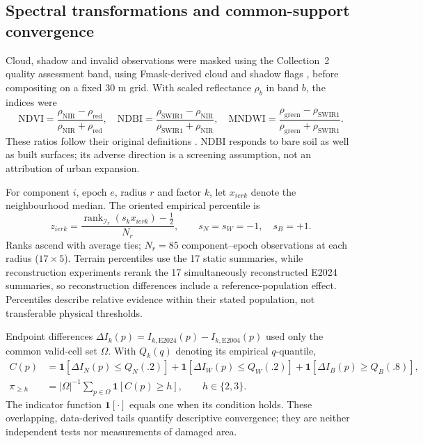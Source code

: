 \subsection{Spectral transformations and common-support convergence}
Cloud, shadow and invalid observations were masked using the Collection~2 quality assessment band, using Fmask-derived cloud and shadow flags \citep{zhu2012fmask,zhu2015fmask}, before compositing on a fixed 30 m grid. With scaled reflectance $\rho_b$ in band $b$, the indices were
\begin{equation}\label{eq:indices}
\mathrm{NDVI}=\frac{\rho_{\mathrm{NIR}}-\rho_{\mathrm{red}}}{\rho_{\mathrm{NIR}}+\rho_{\mathrm{red}}},\quad
\mathrm{NDBI}=\frac{\rho_{\mathrm{SWIR1}}-\rho_{\mathrm{NIR}}}{\rho_{\mathrm{SWIR1}}+\rho_{\mathrm{NIR}}},\quad
\mathrm{MNDWI}=\frac{\rho_{\mathrm{green}}-\rho_{\mathrm{SWIR1}}}{\rho_{\mathrm{green}}+\rho_{\mathrm{SWIR1}}}.
\end{equation}
These ratios follow their original definitions \citep{tucker1979ndvi,zha2003ndbi,xu2006mndwi}. NDBI responds to bare soil as well as built surfaces; its adverse direction is a screening assumption, not an attribution of urban expansion.

For component $i$, epoch $e$, radius $r$ and factor $k$, let $x_{ierk}$ denote the neighbourhood median. The oriented empirical percentile is
\begin{equation}\label{eq:percentile}
z_{ierk}=\frac{\operatorname{rank}_{\mathcal I_r}(s_kx_{ierk})-\tfrac12}{N_r},
\qquad s_N=s_W=-1,\quad s_B=+1.
\end{equation}
Ranks ascend with average ties; $N_r=85$ component--epoch observations at each radius ($17\times5$). Terrain percentiles use the 17 static summaries, while reconstruction experiments rerank the 17 simultaneously reconstructed E2024 summaries, so reconstruction differences include a reference-population effect. Percentiles describe relative evidence within their stated population, not transferable physical thresholds.

Endpoint differences $\Delta I_k(p)=I_{k,\mathrm{E2024}}(p)-I_{k,\mathrm{E2004}}(p)$ used only the common valid-cell set $\Omega$. With $Q_k(q)$ denoting its empirical $q$-quantile,
\begin{equation}\label{eq:convergence}
\begin{aligned}
C(p)&=\mathbf1[\Delta I_N(p)\leq Q_N(.2)]+\mathbf1[\Delta I_W(p)\leq Q_W(.2)]
       +\mathbf1[\Delta I_B(p)\geq Q_B(.8)],\\
\pi_{\geq h}&=|\Omega|^{-1}\sum_{p\in\Omega}\mathbf1[C(p)\geq h],\qquad h\in\{2,3\}.
\end{aligned}
\end{equation}
The indicator function $\mathbf1[\cdot]$ equals one when its condition holds. These overlapping, data-derived tails quantify descriptive convergence; they are neither independent tests nor measurements of damaged area.

